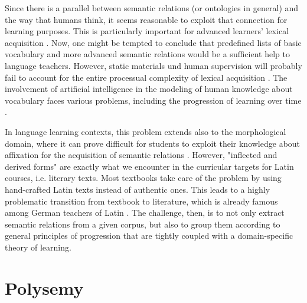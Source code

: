 \documentclass[runningheads]{llncs}
\begin{document}
Since there is a parallel between semantic relations (or ontologies in general) and the way that humans think, it seems reasonable to exploit that connection for learning purposes. This is particularly important for advanced learners' lexical acquisition \parencite[56]{crossleyDevelopmentSemanticRelations2010}. Now, one might be tempted to conclude that predefined lists of basic vocabulary and more advanced semantic relations would be a sufficient help to language teachers. However, static materials und human supervision will probably fail to account for the entire processual complexity of lexical acquisition \parencite[71]{crossleyDevelopmentSemanticRelations2010}. The involvement of artificial intelligence in the modeling of human knowledge about vocabulary faces various problems, including the progression of learning over time \parencite[70]{crossleyDevelopmentSemanticRelations2010}. 

In language learning contexts, this problem extends also to the morphological domain, where it can prove difficult for students to exploit their knowledge about affixation for the acquisition of semantic relations \parencite[248]{gardnerValidatingConstructWord2007}. However, "inflected and derived forms" are exactly what we encounter in the curricular targets for Latin courses, i.e. literary texts. Most textbooks take care of the problem by using hand-crafted Latin texts instead of authentic ones. This leads to a highly problematic transition from textbook to literature, which is already famous among German teachers of Latin \parencite[115]{schibelZurAneignungLateinischer2013}. The challenge, then, is to not only extract semantic relations from a given corpus, but also to group them according to general principles of progression that are tightly coupled with a domain-specific theory of learning.

\section{Polysemy}
\end{document}
